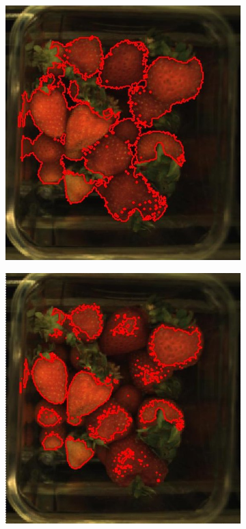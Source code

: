 \documentclass[fleqn,twoside,12pt]{report}
\begin{document}
\begin{figure}[ht]
	\centering
	\begin{subfigure}{.30\textwidth}
		\centering
		\includegraphics[width=.9\linewidth]{over_berries.jpg}
		\caption{}
		\label{fig:over_berries}
	\end{subfigure}%
	\begin{subfigure}{.30\textwidth}
		\centering
		\includegraphics[width=.9\linewidth]{over_hue.jpg}

\end{subfigure}
\end{figure}
\end{document}
